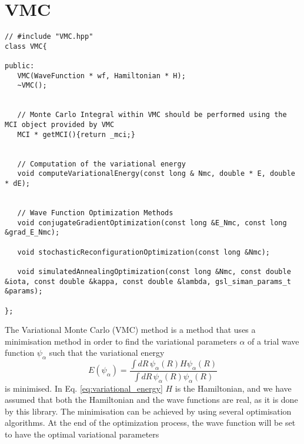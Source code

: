 \documentclass[11pt,a4paper,twoside]{article}
\begin{document}



\section{VMC} %
\label{sec:vmc}

\begin{lstlisting}
// #include "VMC.hpp"
class VMC{

public:
   VMC(WaveFunction * wf, Hamiltonian * H);
   ~VMC();


   // Monte Carlo Integral within VMC should be performed using the MCI object provided by VMC
   MCI * getMCI(){return _mci;}


   // Computation of the variational energy
   void computeVariationalEnergy(const long & Nmc, double * E, double * dE);


   // Wave Function Optimization Methods
   void conjugateGradientOptimization(const long &E_Nmc, const long &grad_E_Nmc);

   void stochasticReconfigurationOptimization(const long &Nmc);

   void simulatedAnnealingOptimization(const long &Nmc, const double &iota, const double &kappa, const double &lambda, gsl_siman_params_t &params);

};
\end{lstlisting}

The Variational Monte Carlo (VMC) method is a method that uses a minimisation method in order to find the variational parameters $\alpha$ of a trial wave function $\psi_{\alpha}$ such that the variational energy
\begin{equation}
  E(\psi_{\alpha}) = \frac{\int dR \, \psi_{\alpha}(R) H \psi_{\alpha}(R)}{\int dR \, \psi_{\alpha}(R) \psi_{\alpha}(R)}  \label{eq:variational_energy}
\end{equation}
is minimised.
In Eq. \eqref{eq:variational_energy} $H$ is the Hamiltonian, and we have assumed that both the Hamiltonian and the wave functions are real, as it is done by this library.
The minimisation can be achieved by using several optimisation algorithms. At the end of the optimization process, the wave function will be set to have the optimal variational parameters
\end{document}
